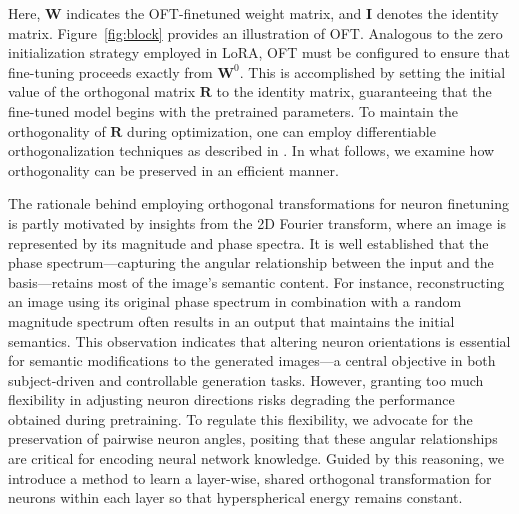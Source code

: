 \begin{itemize}[leftmargin=*,nosep]
Here, $\bm{W}$ indicates the OFT-finetuned weight matrix, and $\bm{I}$ denotes the identity matrix. Figure~\ref{fig:block} provides an illustration of OFT. Analogous to the zero initialization strategy employed in LoRA, OFT must be configured to ensure that fine-tuning proceeds exactly from $\bm{W}^0$. This is accomplished by setting the initial value of the orthogonal matrix $\bm{R}$ to the identity matrix, guaranteeing that the fine-tuned model begins with the pretrained parameters. To maintain the orthogonality of $\bm{R}$ during optimization, one can employ differentiable orthogonalization techniques as described in \cite{liu2021orthogonal,lezcano2019cheap}. In what follows, we examine how orthogonality can be preserved in an efficient manner.

The rationale behind employing orthogonal transformations for neuron finetuning is partly motivated by insights from the 2D Fourier transform, where an image is represented by its magnitude and phase spectra. It is well established that the phase spectrum—capturing the angular relationship between the input and the basis—retains most of the image’s semantic content. For instance, reconstructing an image using its original phase spectrum in combination with a random magnitude spectrum often results in an output that maintains the initial semantics. This observation indicates that altering neuron orientations is essential for semantic modifications to the generated images—a central objective in both subject-driven and controllable generation tasks. However, granting too much flexibility in adjusting neuron directions risks degrading the performance obtained during pretraining. To regulate this flexibility, we advocate for the preservation of pairwise neuron angles, positing that these angular relationships are critical for encoding neural network knowledge. Guided by this reasoning, we introduce a method to learn a layer-wise, shared orthogonal transformation for neurons within each layer so that hyperspherical energy remains constant.


\end{itemize}

